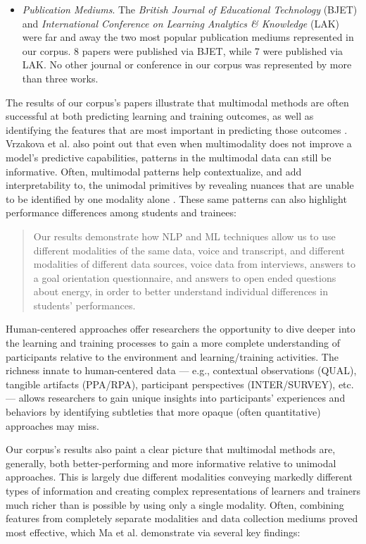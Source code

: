 \documentclass[manuscript,screen,review]{acmart}
\begin{document}
\begin{itemize}
    \item  \textit{Publication Mediums}. The \textit{British Journal of Educational Technology} (BJET) and \textit{International Conference on Learning Analytics \& Knowledge} (LAK) were far and away the two most popular publication mediums represented in our corpus. 8 papers were published via BJET, while 7 were published via LAK. No other journal or conference in our corpus was represented by more than three works.
\end{itemize}

The results of our corpus's papers illustrate that multimodal methods are often successful at both predicting learning and training outcomes, as well as identifying the features that are most important in predicting those outcomes \cite{3339002981,1637690235,3783339081}. Vrzakova et al. also point out that even when multimodality does not improve a model's predictive capabilities, patterns in the multimodal data can still be informative. Often, multimodal patterns help contextualize, and add interpretability to, the unimodal primitives by revealing nuances that are unable to be identified by one modality alone \cite{1770989706}. These same patterns can also highlight performance differences among students and trainees:

\begin{quote}
    Our results demonstrate how NLP and ML techniques allow us to use different modalities of the same data, voice and transcript, and different modalities of different data sources, voice data from interviews, answers to a goal orientation questionnaire, and answers to open ended questions about energy, in order to better understand individual differences in students’ performances. \cite{32184286}
\end{quote}

Human-centered approaches offer researchers the opportunity to dive deeper into the learning and training processes to gain a more complete understanding of participants relative to the environment and learning/training activities. The richness innate to human-centered data --- e.g., contextual observations (QUAL), tangible artifacts (PPA/RPA), participant perspectives (INTER/SURVEY), etc. --- allows researchers to gain unique insights into participants' experiences and behaviors by identifying subtleties that more opaque (often quantitative) approaches may miss. 

Our corpus's results also paint a clear picture that multimodal methods are, generally, both better-performing and more informative relative to unimodal approaches. This is largely due different modalities conveying markedly different types of information and creating complex representations of learners and trainers much richer than is possible by using only a single modality. Often, combining features from completely separate modalities and data collection mediums proved most effective, which Ma et al. \cite{3754172825} demonstrate via several key findings:
\end{document}
